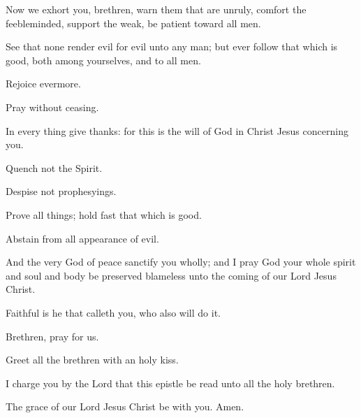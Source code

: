\Verse Now we exhort you, brethren, warn them that are unruly, comfort the feebleminded, support the weak, be patient toward all men.

\Verse See that none render evil for evil unto any man; but ever follow that which is good, both among yourselves, and to all men.

\Verse Rejoice evermore.

\Verse Pray without ceasing.

\Verse In every thing give thanks: for this is the will of God in Christ Jesus concerning you.

\Verse Quench not the Spirit.

\Verse Despise not prophesyings.

\Verse Prove all things; hold fast that which is good.

\Verse Abstain from all appearance of evil.

\Verse And the very God of peace sanctify you wholly; and I pray God your whole spirit and soul and body be preserved blameless unto the coming of our Lord Jesus Christ.

\Verse Faithful is he that calleth you, who also will do it.

\Verse Brethren, pray for us.

\Verse Greet all the brethren with an holy kiss.

\Verse I charge you by the Lord that this epistle be read unto all the holy brethren.

\Verse The grace of our Lord Jesus Christ be with you. Amen.

